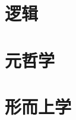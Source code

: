 \documentclass[UTF8]{RepresentationUniverse}
\begin{document}
\section{逻辑}
\section{元哲学}
\section{形而上学}
\end{document}
